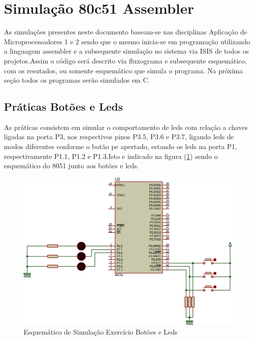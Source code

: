 \documentclass{Fabiano_file}
\begin{document}
\pagebreak

\section{Simulação 80c51 Assembler}
As simulações presentes neste documento baseam-se nas disciplinas Aplicação de Microprocessadores 1 e 2 sendo que o mesmo inicia-se em programação utilizando 
a linguagem assembler e a 
subsequente simulação no sistema via ISIS de todos os projetos.Assim o código será descrito via fluxograma e subsequente esquemático, com os resutados, ou 
somente esquemático que simula o programa. Na próxima seção todos os programas serão simulados em C.\\

\subsection{Práticas Botões e Leds}

As práticas consistem em simular o comportamento de leds com relação a chaves ligadas na porta P3, nos respectivos pinos P3.5, P3.6 e P3.7, ligando leds de
modos diferentes conforme o botão pe apertado, estando os leds na porta P1, respectivamente P1.1, P1.2 e P1.3.Isto e indicado na figura (\ref{fig:pratica_led_e_botoes}) 
sendo o esquemático do 8051 junto aos botões e leds. 

\begin{figure}[h!]
\centering
\includegraphics[width=.9\textwidth]{pratica_led_e_botoes.pdf}
\caption{Esquemático de Simulação Exercício Botões e Leds}
\label{fig:pratica_led_e_botoes}
\end{figure}

\pagebreak
\end{document}
